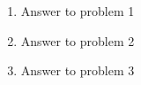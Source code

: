 

\oddsidemargin 0in
\evensidemargin 0in
\textwidth 6.5in
\topmargin -0.5in
\textheight 9.0in




\pagestyle{myheadings}  %

\begin{enumerate}
\item Answer to problem 1
\item Answer to problem 2
\item Answer to problem 3
\end{enumerate}



